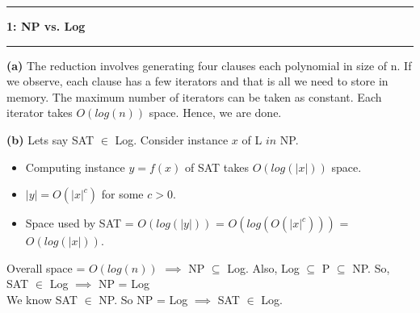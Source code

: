 \documentclass[11pt]{article}
\newcommand\question[2]{\vspace{.25in}\hrule\textbf{#1: #2}\vspace{.5em}\hrule\vspace{.10in}}
\renewcommand\part[1]{\vspace{.10in}\textbf{(#1)}}
\begin{document}
\raggedright
\newcommand\NAME{Rupanshu Ganvir}  %
\newcommand\ANDREWID{140050005}     %
\newcommand\HWNUM{7}              %


\question{1}{NP vs. Log}

\part{a}
The reduction involves generating four clauses each polynomial in size of n.
If we observe, each clause has a few iterators and that is all we need to 
store in memory. The maximum number of iterators can be taken as constant.
Each iterator takes $O(log(n))$ space. Hence, we are done.

\part{b} Lets say SAT $\in$ Log. Consider instance $x$ of L $in$ NP. 
\vspace{-0.10in}
\begin{itemize}
\setlength\itemsep{0.01in}
\item Computing instance $y=f(x)$ of SAT takes $O(log(|x|))$ space. 
\item $|y| = O(|x|^{c})$ for some $c > 0$.
\item Space used by SAT = $O(log(|y|))$ = $O(log(O(|x|^c)))$ = $O(log(|x|))$.
\end{itemize}
\vspace{-0.10in}
Overall space = $O(log(n))$ $\implies$ NP $\subseteq$ Log. Also,
Log $\subseteq$ P $\subseteq$ NP. So, SAT $\in$ Log $\implies$ NP = Log\\
\vspace{0.1in}
We know SAT $\in$ NP. So NP = Log $\implies$ SAT $\in$ Log. 
\end{document}
